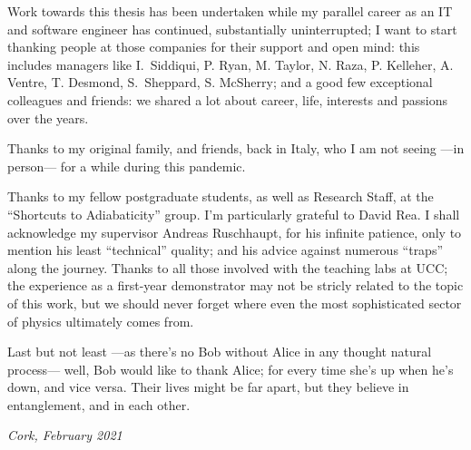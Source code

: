 {
\small
Work towards this thesis has been undertaken while my parallel career
as an IT and software engineer has continued,
substantially uninterrupted;
I want to start thanking people at those companies for their support and open mind:
this includes managers like
I.~Siddiqui, P. Ryan, M. Taylor, N. Raza, P. Kelleher, A. Ventre, T. Desmond, S.~Sheppard, S. McSherry;
and a good few exceptional colleagues and friends:
we shared a lot about career, life, interests and passions over the years.

Thanks to my original family, and friends, back in Italy,
who I am not seeing ---in person--- for a while during this pandemic.

Thanks to my fellow postgraduate students,
as well as Research Staff,
at the ``Shortcuts to Adiabaticity'' group.
I'm particularly grateful to David Rea.
I shall acknowledge my supervisor Andreas Ruschhaupt, for his infinite patience,
only to mention his least ``technical'' quality;
and his advice against numerous ``traps'' along the journey.
Thanks to all those involved with the teaching labs at UCC;
the  experience as a  first-year demonstrator may not be stricly related to the topic of this work,
but we should never forget where even the most sophisticated sector of physics
ultimately comes from.

Last but not least ---as there's no Bob without Alice in any thought natural process---
well, Bob would like to thank Alice;
for every time she’s up when he’s down, and vice versa.
Their lives might be far apart, but they believe in entanglement, and in each other.

\textit{Cork, February 2021}
}